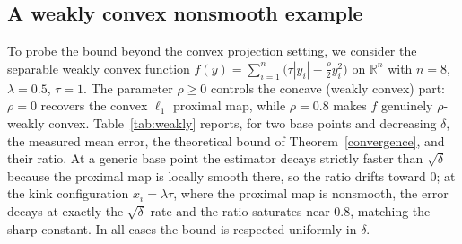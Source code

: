 \documentclass[11pt]{article}
\newcommand{\1}{\mathds{1}}
\theoremstyle{definition}
\theoremstyle{remark}
\theoremstyle{definition}
\begin{document}
\subsection{A weakly convex nonsmooth example}
To probe the bound beyond the convex projection setting, we consider the separable weakly convex function $f(y)=\sum_{i=1}^n\big(\tau|y_i|-\tfrac{\rho}{2}y_i^2\big)$ on $\mathbb{R}^n$ with $n=8$, $\lambda=0.5$, $\tau=1$. The parameter $\rho\ge0$ controls the concave (weakly convex) part: $\rho=0$ recovers the convex $\ell_1$ proximal map, while $\rho=0.8$ makes $f$ genuinely $\rho$-weakly convex. Table~\ref{tab:weakly} reports, for two base points and decreasing $\delta$, the measured mean error, the theoretical bound of Theorem~\ref{convergence}, and their ratio. At a generic base point the estimator decays strictly faster than $\sqrt\delta$ because the proximal map is locally smooth there, so the ratio drifts toward $0$; at the kink configuration $x_i=\lambda\tau$, where the proximal map is nonsmooth, the error decays at exactly the $\sqrt\delta$ rate and the ratio saturates near $0.8$, matching the sharp constant. In all cases the bound is respected uniformly in $\delta$.
\end{document}

